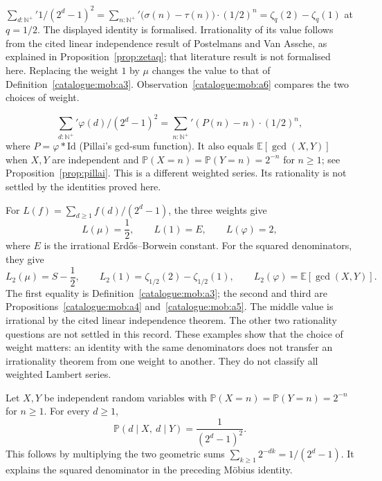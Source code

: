 \begin{prop}\label{catalogue:mob:a4}
$\sum_{d:\mathbb{N}^+}' 1/(2^d-1)^2 = \sum_{n:\mathbb{N}^+}' \big(\sigma(n)-\tau(n)\big)\cdot(1/2)^n = \zeta_q(2) - \zeta_q(1)$ at $q=1/2$. The displayed identity is formalised. Irrationality of its value follows
from the cited linear independence result of Postelmans and Van Assche,
as explained in Proposition~\ref{prop:zetaq}; that literature result is
not formalised here. Replacing the weight $1$ by $\mu$ changes the value
to that of Definition~\ref{catalogue:mob:a3}. Observation~\ref{catalogue:mob:a6}
compares the two choices of weight.
\end{prop}

\begin{prop}\label{catalogue:mob:a5}
\[
\sum_{d:\mathbb{N}^+}' \varphi(d)/(2^d-1)^2 = \sum_{n:\mathbb{N}^+}' (P(n)-n)\cdot(1/2)^n,
\]
where $P = \varphi * \mathrm{Id}$ (Pillai's gcd-sum function). It also equals $\mathbb E[\gcd(X,Y)]$ when $X,Y$ are independent and
$\mathbb P(X=n)=\mathbb P(Y=n)=2^{-n}$ for $n\ge1$; see
Proposition~\ref{prop:pillai}.
This is a different weighted series. Its rationality is not settled by
the identities proved here.
\end{prop}

\begin{obs}\label{catalogue:mob:a6}
For $L(f)=\sum_{d\ge1}f(d)/(2^d-1)$, the three weights give
\[
 L(\mu)=\frac12,\qquad L(1)=E,\qquad L(\varphi)=2,
\]
where $E$ is the irrational Erd\H{o}s--Borwein constant.
For the squared denominators, they give
\[
 L_2(\mu)=S-\frac12,\qquad
 L_2(1)=\zeta_{1/2}(2)-\zeta_{1/2}(1),\qquad
 L_2(\varphi)=\mathbb E[\gcd(X,Y)].
\]
The first equality is Definition~\ref{catalogue:mob:a3}; the second and
third are Propositions~\ref{catalogue:mob:a4} and~\ref{catalogue:mob:a5}.
The middle value is irrational by the cited linear independence theorem.
The other two rationality questions are not settled in this record.
These examples show that the choice of weight matters: an identity with
the same denominators does not transfer an irrationality theorem from one
weight to another. They do not classify all weighted Lambert series.
\end{obs}

\begin{prop}\label{catalogue:mob:a7}
Let $X,Y$ be independent random variables with
$\mathbb P(X=n)=\mathbb P(Y=n)=2^{-n}$ for $n\ge1$. For every $d\ge1$,
\[
 \mathbb P(d\mid X,\ d\mid Y)=\frac1{(2^d-1)^2}.
\]
This follows by multiplying the two geometric sums
$\sum_{k\ge1}2^{-dk}=1/(2^d-1)$. It explains the squared denominator
in the preceding M\"obius identity.
\end{prop}

